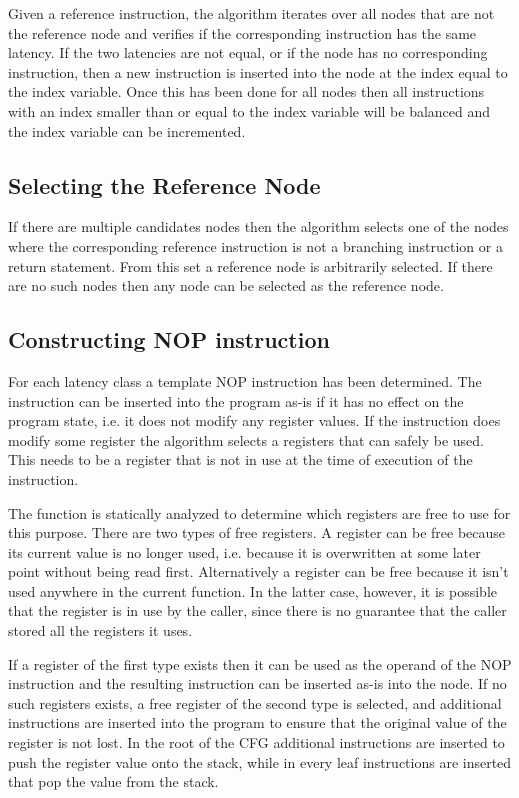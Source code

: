 Given a reference instruction, the algorithm iterates over all nodes that are not the reference node and verifies if the corresponding instruction has the same latency. 
If the two latencies are not equal, or if the node has no corresponding instruction,  then a new instruction is inserted into the node at the index equal to the index variable. 
Once this has been done for all nodes then all instructions with an index smaller than or
equal to the index variable will be balanced and the index variable can be incremented. 

\subsection{Selecting the Reference Node}
If there are multiple candidates nodes then the algorithm selects one of the nodes where the corresponding reference instruction is not a branching instruction or a return statement. From this set a reference node 
is arbitrarily selected. If there are no such nodes then any node can be selected as the reference node.  

\subsection{Constructing NOP instruction}
For each latency class a template NOP instruction has been determined. The instruction can be inserted into the program as-is if it has no effect on the program state, i.e. it does not modify any register values. 
If the instruction does modify some register the algorithm selects a registers that can safely be used. This needs to be a register that is not in use at the time of execution of the instruction. 

The function is statically analyzed to determine which registers are free to use for this purpose. There are two types of free registers. 
A register can be free because its current value is no longer used, i.e. because it is overwritten at some later point without
being read first. Alternatively a register can be free because it isn't used anywhere in the current function. In the latter case, however, it is possible that the register is in use by the caller, 
since there is no guarantee that the caller stored all the registers it uses. 

If a register of the first type exists then it can be used as the operand of the NOP instruction and the resulting instruction 
can be inserted as-is into the node. If no such registers exists, a free register of the second type is selected, and additional instructions are inserted into the program to ensure that the 
original value of the register is not lost. In the root of the CFG additional instructions are inserted to push the register value onto the stack, while in every leaf instructions are inserted 
that pop the value from the stack. 

